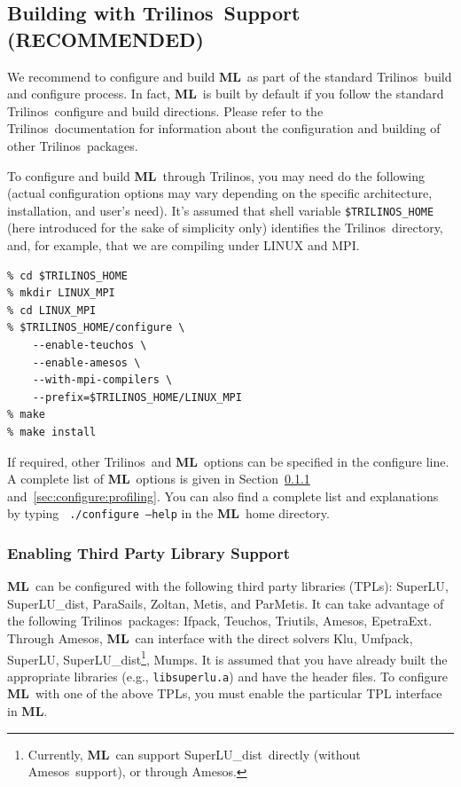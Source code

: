\documentclass{article}[11pt]
\newcommand{\epetraext}  {{\sc EpetraExt}}
\newcommand{\ML}     {{\bf ML}}
\newcommand{\trilinos}  {{\sc Trilinos}}
\newcommand{\amesos}  {{\sc Amesos}}
\newcommand{\umfpack}  {{\sc Umfpack}}
\newcommand{\superlu}  {{\sc SuperLU}}
\newcommand{\superludist}  {{\sc SuperLU\_dist}}
\newcommand{\mumps}  {{\sc Mumps}}
\newcommand{\klu}  {{\sc Klu}}
\newcommand{\metis}  {{\sc Metis}}
\newcommand{\parmetis}  {{\sc ParMetis}}
\newcommand{\triutils}  {{\sc Triutils}}
\newcommand{\ifpack}  {{\sc Ifpack}}
\newcommand{\parasails}  {{\sc ParaSails}}
\newcommand{\teuchos}  {{\sc Teuchos}}
\newcommand{\zoltan}  {{\sc Zoltan}}
\begin{document}
%
%
%
\subsection{Building with \trilinos~Support (RECOMMENDED)}
\label{sec:build:trilinos}
%
We recommend to configure and build \ML\ as part of the standard \trilinos~build and configure process.  In fact,
\ML\ is built by default if you follow the standard \trilinos~configure and build directions. Please refer to the \trilinos~documentation for information about the configuration and building of
other \trilinos~packages.

To configure and build \ML\ through \trilinos, you may need do the
following (actual configuration options may vary depending on the
specific architecture, installation, and user's need).  It's assumed
that shell variable \verb!$TRILINOS_HOME! (here introduced for the
sake of simplicity only) identifies the
\trilinos~directory, and, for example, that we are compiling under LINUX
and MPI.
\begin{verbatim}
% cd $TRILINOS_HOME
% mkdir LINUX_MPI
% cd LINUX_MPI
% $TRILINOS_HOME/configure \
    --enable-teuchos \
    --enable-amesos \
    --with-mpi-compilers \
    --prefix=$TRILINOS_HOME/LINUX_MPI
% make
% make install
\end{verbatim}

If required, other \trilinos~and \ML\ options can be specified in the
configure line. A complete list of \ML\ options is given in
Section~\ref{sec:configure:3pl} and~\ref{sec:configure:profiling}.  You
can also find a complete list and explanations by typing {\tt
  ./configure --help} in the \ML\ home directory.
%
\subsubsection{Enabling Third Party Library Support}
\label{sec:configure:3pl}
%

\ML\ can be configured with the following third party libraries (TPLs):
\superlu, \superludist, \parasails, \zoltan, \metis, and \parmetis. It can take advantage of
the following \trilinos~packages: \ifpack, \teuchos, \triutils,
\amesos, \epetraext. Through \amesos, \ML\ can interface with the direct solvers
\klu, \umfpack, \superlu, \superludist\footnote{Currently, \ML\ can
  support \superludist~directly (without \amesos~support), or through
  \amesos.}, \mumps.  It is assumed that you have already built the
appropriate libraries (e.g., {\tt libsuperlu.a}) and have the header
files.  To configure \ML\ with one of the above TPLs, you must enable the
particular TPL interface in \ML. 
\medskip
\end{document}
